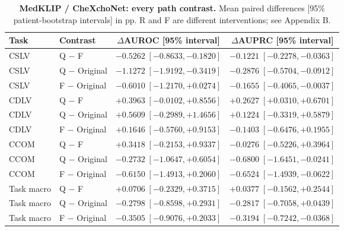 \begin{table}[tp]
\centering
\caption{\textbf{MedKLIP / CheXchoNet: every path contrast.} Mean paired differences [95\% patient-bootstrap intervals] in pp. R and F are different interventions; see Appendix B.}
\label{tab:supp-cardiac-path-ci-medklip}
\small
\setlength{\tabcolsep}{4pt}
\begin{tabular*}{\textwidth}{@{\extracolsep{\fill}}llcc@{}}
\toprule
Task & Contrast & $\Delta$AUROC [95\% interval] & $\Delta$AUPRC [95\% interval] \\
\midrule
CSLV & Q $-$ F & $-0.5262\;[-0.8633,-0.1820]$ & $-0.1221\;[-0.2278,-0.0363]$ \\
CSLV & Q $-$ Original & $-1.1272\;[-1.9192,-0.3419]$ & $-0.2876\;[-0.5704,-0.0912]$ \\
CSLV & F $-$ Original & $-0.6010\;[-1.2170,+0.0274]$ & $-0.1655\;[-0.4065,-0.0037]$ \\
CDLV & Q $-$ F & $+0.3963\;[-0.0102,+0.8556]$ & $+0.2627\;[+0.0310,+0.6701]$ \\
CDLV & Q $-$ Original & $+0.5609\;[-0.2989,+1.4656]$ & $+0.1224\;[-0.3319,+0.5879]$ \\
CDLV & F $-$ Original & $+0.1646\;[-0.5760,+0.9153]$ & $-0.1403\;[-0.6476,+0.1955]$ \\
CCOM & Q $-$ F & $+0.3418\;[-0.2153,+0.9337]$ & $-0.0276\;[-0.5226,+0.3964]$ \\
CCOM & Q $-$ Original & $-0.2732\;[-1.0647,+0.6054]$ & $-0.6800\;[-1.6451,-0.0241]$ \\
CCOM & F $-$ Original & $-0.6150\;[-1.4913,+0.2060]$ & $-0.6524\;[-1.4939,-0.0622]$ \\
Task macro & Q $-$ F & $+0.0706\;[-0.2329,+0.3715]$ & $+0.0377\;[-0.1562,+0.2544]$ \\
Task macro & Q $-$ Original & $-0.2798\;[-0.8598,+0.2931]$ & $-0.2817\;[-0.7058,+0.0439]$ \\
Task macro & F $-$ Original & $-0.3505\;[-0.9076,+0.2033]$ & $-0.3194\;[-0.7242,-0.0368]$ \\
\bottomrule
\end{tabular*}
\end{table}

